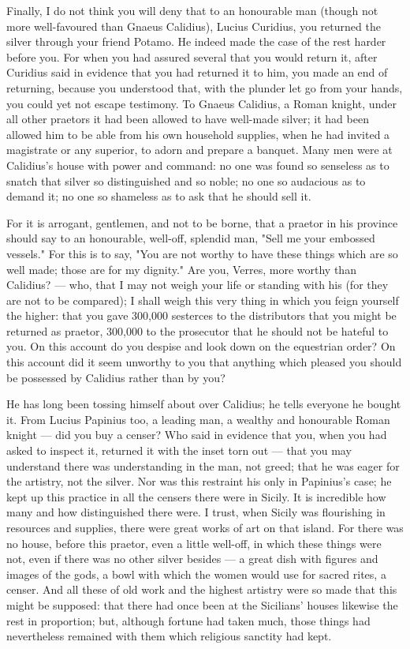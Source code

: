  Finally, I do not think you will deny that to an honourable man (though not more well-favoured than Gnaeus Calidius), Lucius Curidius, you returned the silver through your friend Potamo. He indeed made the case of the rest harder before you. For when you had assured several that you would return it, after Curidius said in evidence that you had returned it to him, you made an end of returning, because you understood that, with the plunder let go from your hands, you could yet not escape testimony. To Gnaeus Calidius, a Roman knight, under all other praetors it had been allowed to have well-made silver; it had been allowed him to be able from his own household supplies, when he had invited a magistrate or any superior, to adorn and prepare a banquet. Many men were at Calidius's house with power and command: no one was found so senseless as to snatch that silver so distinguished and so noble; no one so audacious as to demand it; no one so shameless as to ask that he should sell it.

 For it is arrogant, gentlemen, and not to be borne, that a praetor in his province should say to an honourable, well-off, splendid man, "Sell me your embossed vessels." For this is to say, "You are not worthy to have these things which are so well made; those are for my dignity." Are you, Verres, more worthy than Calidius? --- who, that I may not weigh your life or standing with his (for they are not to be compared); I shall weigh this very thing in which you feign yourself the higher: that you gave 300,000 sesterces to the distributors that you might be returned as praetor, 300,000 to the prosecutor that he should not be hateful to you. On this account do you despise and look down on the equestrian order? On this account did it seem unworthy to you that anything which pleased you should be possessed by Calidius rather than by you?

 He has long been tossing himself about over Calidius; he tells everyone he bought it. From Lucius Papinius too, a leading man, a wealthy and honourable Roman knight --- did you buy a censer? Who said in evidence that you, when you had asked to inspect it, returned it with the inset torn out --- that you may understand there was understanding in the man, not greed; that he was eager for the artistry, not the silver. Nor was this restraint his only in Papinius's case; he kept up this practice in all the censers there were in Sicily. It is incredible how many and how distinguished there were. I trust, when Sicily was flourishing in resources and supplies, there were great works of art on that island. For there was no house, before this praetor, even a little well-off, in which these things were not, even if there was no other silver besides --- a great dish with figures and images of the gods, a bowl with which the women would use for sacred rites, a censer. And all these of old work and the highest artistry were so made that this might be supposed: that there had once been at the Sicilians' houses likewise the rest in proportion; but, although fortune had taken much, those things had nevertheless remained with them which religious sanctity had kept.

